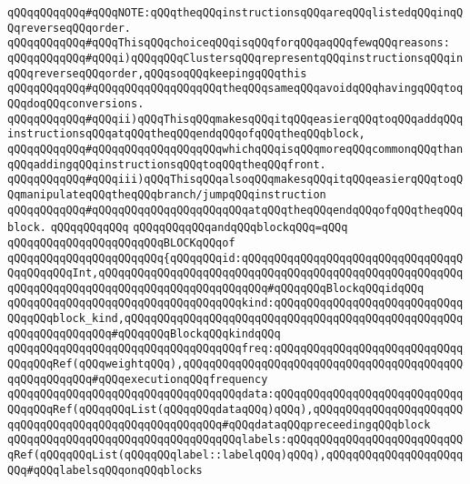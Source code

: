 \newline
\verb|qQQqqQQqqQQq#qQQqNOTE:qQQqtheqQQqinstructionsqQQqareqQQqlistedqQQqinqQQqreverseqQQqorder.|\newline
\verb|qQQqqQQqqQQq#qQQqThisqQQqchoiceqQQqisqQQqforqQQqaqQQqfewqQQqreasons:|\newline
\verb|qQQqqQQqqQQq#qQQqi)qQQqqQQqClustersqQQqrepresentqQQqinstructionsqQQqinqQQqreverseqQQqorder,qQQqsoqQQqkeepingqQQqthis|\newline
\verb|qQQqqQQqqQQq#qQQqqQQqqQQqqQQqqQQqtheqQQqsameqQQqavoidqQQqhavingqQQqtoqQQqdoqQQqconversions.|\newline
\verb|qQQqqQQqqQQq#qQQqii)qQQqThisqQQqmakesqQQqitqQQqeasierqQQqtoqQQqaddqQQqinstructionsqQQqatqQQqtheqQQqendqQQqofqQQqtheqQQqblock,|\newline
\verb|qQQqqQQqqQQq#qQQqqQQqqQQqqQQqqQQqwhichqQQqisqQQqmoreqQQqcommonqQQqthanqQQqaddingqQQqinstructionsqQQqtoqQQqtheqQQqfront.|\newline
\verb|qQQqqQQqqQQq#qQQqiii)qQQqThisqQQqalsoqQQqmakesqQQqitqQQqeasierqQQqtoqQQqmanipulateqQQqtheqQQqbranch/jumpqQQqinstruction|\newline
\verb|qQQqqQQqqQQq#qQQqqQQqqQQqqQQqqQQqqQQqatqQQqtheqQQqendqQQqofqQQqtheqQQqblock.|\newline
\newline
\verb|qQQqqQQqqQQq|\newline
\verb|qQQqqQQqqQQqandqQQqblockqQQq=qQQq|\newline
\verb|qQQqqQQqqQQqqQQqqQQqqQQqBLOCKqQQqof|\newline
\verb|qQQqqQQqqQQqqQQqqQQqqQQq{qQQqqQQqid:qQQqqQQqqQQqqQQqqQQqqQQqqQQqqQQqqQQqqQQqqQQqInt,qQQqqQQqqQQqqQQqqQQqqQQqqQQqqQQqqQQqqQQqqQQqqQQqqQQqqQQqqQQqqQQqqQQqqQQqqQQqqQQqqQQqqQQqqQQqqQQq#qQQqqQQqBlockqQQqidqQQq|\newline
\verb|qQQqqQQqqQQqqQQqqQQqqQQqqQQqqQQqqQQqkind:qQQqqQQqqQQqqQQqqQQqqQQqqQQqqQQqqQQqblock_kind,qQQqqQQqqQQqqQQqqQQqqQQqqQQqqQQqqQQqqQQqqQQqqQQqqQQqqQQqqQQqqQQqqQQq#qQQqqQQqBlockqQQqkindqQQq|\newline
\verb|qQQqqQQqqQQqqQQqqQQqqQQqqQQqqQQqqQQqfreq:qQQqqQQqqQQqqQQqqQQqqQQqqQQqqQQqqQQqRef(qQQqweightqQQq),qQQqqQQqqQQqqQQqqQQqqQQqqQQqqQQqqQQqqQQqqQQqqQQqqQQqqQQq#qQQqexecutionqQQqfrequency|\newline
\verb|qQQqqQQqqQQqqQQqqQQqqQQqqQQqqQQqqQQqdata:qQQqqQQqqQQqqQQqqQQqqQQqqQQqqQQqqQQqRef(qQQqqQQqList(qQQqqQQqdataqQQq)qQQq),qQQqqQQqqQQqqQQqqQQqqQQqqQQqqQQqqQQqqQQqqQQqqQQqqQQqqQQq#qQQqdataqQQqpreceedingqQQqblock|\newline
\verb|qQQqqQQqqQQqqQQqqQQqqQQqqQQqqQQqqQQqlabels:qQQqqQQqqQQqqQQqqQQqqQQqqQQqRef(qQQqqQQqList(qQQqqQQqlabel::labelqQQq)qQQq),qQQqqQQqqQQqqQQqqQQqqQQq#qQQqlabelsqQQqonqQQqblocks|\newline
